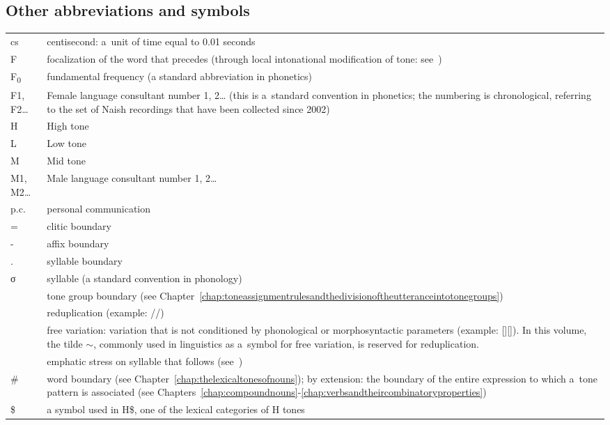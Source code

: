 \begin{refsection}
\section*{Other abbreviations and symbols}
\label{sec:othersymbols}

\begin{table}[H]
{\renewcommand{\arraystretch}{1.35}
\begin{tabularx}{\textwidth}{ @{}l Q } 
 cs & centisecond: a~unit of time equal to 0.01 seconds\\
 F & focalization of the word that precedes (through local intonational modification of tone: see~)\\
 F\textsubscript{0} & fundamental frequency (a standard abbreviation in phonetics)\\
 F1, F2{\dots} & Female language consultant number 1, 2{\dots} (this is a~standard convention in phonetics; the numbering is chronological, referring to the set of Naish recordings that have been collected since 2002)\\
 H & High tone\\
 L & Low tone\\
 M & Mid tone\\
 M1, M2{\dots} & Male language consultant number 1, 2{\dots}\\
 p.c. & personal communication\\
= & clitic boundary\\
- & affix boundary\\
. & syllable boundary\\
σ & syllable (a standard convention in phonology)\\
\ipa{|} & tone group boundary (see Chapter~\ref{chap:toneassignmentrulesandthedivisionoftheutteranceintotonegroups})\\
\ipa{{$\sim$}} & reduplication (example: //)\\
 & free variation: variation that is not conditioned by phonological or morphosyntactic parameters (example: []{\kern2pt}[]). In this volume, the tilde {$\sim$}, commonly used in linguistics as a~symbol for free variation, is reserved for reduplication.\\
 & emphatic stress on syllable that follows (see~)\\ 
\# & word boundary (see Chapter~\ref{chap:thelexicaltonesofnouns}); by extension: the boundary of the entire expression to which a~tone pattern is associated (see Chapters~\ref{chap:compoundnouns}-\ref{chap:verbsandtheircombinatoryproperties})\\
\$ & a symbol used in H\$, one of the lexical categories of H tones\\
\end{tabularx}}
\end{table}


\end{refsection}
